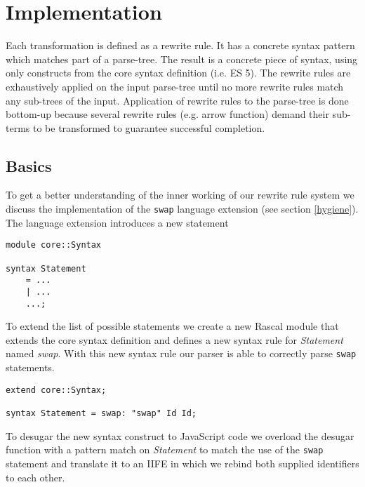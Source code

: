 \chapter{Implementation} %

\label{Chapter5}


Each transformation is defined as a rewrite rule. It has a concrete syntax pattern which matches part of a parse-tree. The result is a concrete piece of syntax, using only constructs from the core syntax definition (i.e. ES 5).
The rewrite rules are exhaustively applied on the input parse-tree until no more rewrite rules match any sub-trees of the input. Application of rewrite rules to the parse-tree is done bottom-up because several rewrite rules (e.g. arrow function) demand their sub-terms to be transformed to guarantee successful completion.

\section{Basics}
To get a better understanding of the inner working of our rewrite rule system we discuss the implementation of the \lstinline$swap$ language extension (see section \ref{hygiene}). The language extension introduces a new statement 

\begin{lstlisting}[caption=Core syntax,language=rascal]
module core::Syntax

syntax Statement 
	= ...
	| ...
	...;
\end{lstlisting}

To extend the list of possible statements we create a new Rascal module that extends the core syntax definition and defines a new syntax rule for \textit{Statement} named \textit{swap}. With this new syntax rule our parser is able to correctly parse \lstinline$swap$ statements.

\begin{lstlisting}[caption=Swap statement syntax,language=rascal]
extend core::Syntax;

syntax Statement = swap: "swap" Id Id;
\end{lstlisting}

To desugar the new syntax construct to JavaScript code we overload the desugar function with a pattern match on 
\textit{Statement} to match the use of the \lstinline$swap$ statement and translate it to an IIFE in which we rebind both supplied identifiers to each other.

